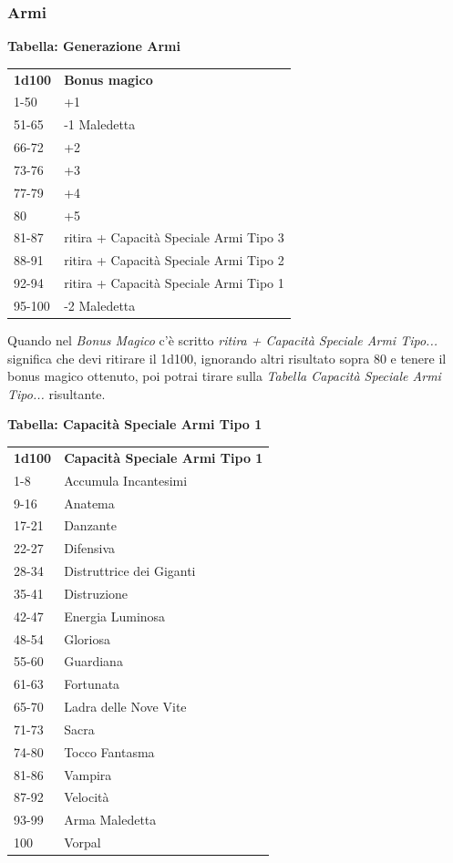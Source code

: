 \begin{multicols}{2}
	\subsubsection{Armi}

	\textbf{Tabella: Generazione Armi}

	\medskip

	\begin{tabularx}{0.45\textwidth}{lX}
		\textbf{1d100} & \textbf{Bonus magico}\\
		1-50 &  +1\\
		51-65 & -1 Maledetta\\
		66-72 & +2\\
		73-76 & +3\\
		77-79 & +4\\
		80 &    +5\\
		81-87 & ritira + Capacità Speciale Armi Tipo 3\\
		88-91 & ritira + Capacità Speciale Armi Tipo 2\\
		92-94 & ritira + Capacità Speciale Armi Tipo 1\\
		95-100 &-2 Maledetta\\
	\end{tabularx}

	\medskip

	Quando nel \textit{Bonus Magico} c'è scritto \textit{ritira + Capacità Speciale Armi Tipo...} significa che devi ritirare il 1d100, ignorando altri risultato sopra 80 e tenere il bonus magico ottenuto, poi potrai tirare sulla \textit{Tabella Capacità Speciale Armi Tipo...} risultante.

	\medskip

	\textbf{Tabella: Capacità Speciale Armi Tipo 1}

	\medskip

	\begin{tabular}{ll}
		\textbf{1d100} & \textbf{Capacità Speciale Armi Tipo 1}\\
		1-8 &Accumula Incantesimi\\
		9-16 &Anatema\\
		17-21& Danzante\\
		22-27& Difensiva\\
		28-34& Distruttrice dei Giganti\\
		35-41& Distruzione\\
		42-47& Energia Luminosa\\
		48-54& Gloriosa\\
		55-60& Guardiana\\
		61-63& Fortunata\\
		65-70& Ladra delle Nove Vite\\
		71-73& Sacra\\
		74-80& Tocco Fantasma\\
		81-86& Vampira\\
		87-92& Velocità\\
		93-99& Arma Maledetta\\
		100 &Vorpal\\
	\end{tabular}


\end{multicols}
